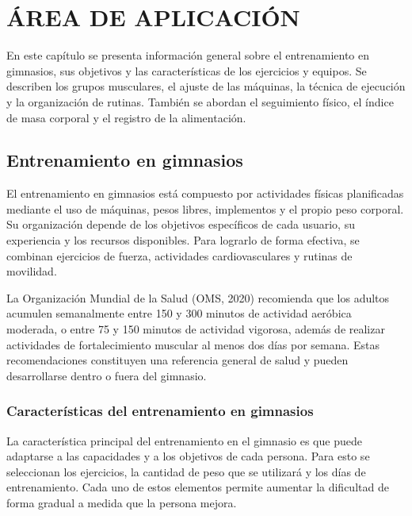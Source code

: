 \chapter{ÁREA DE APLICACIÓN}
\label{cap:area-aplicacion}

En este capítulo se presenta información general sobre el entrenamiento en
gimnasios, sus objetivos y las características de los ejercicios y equipos.
Se describen los grupos musculares, el ajuste de las máquinas, la técnica
de ejecución y la organización de rutinas. También se abordan el seguimiento
físico, el índice de masa corporal y el registro de la alimentación.

\section{Entrenamiento en gimnasios}
\label{sec:entrenamiento-gimnasios}

El entrenamiento en gimnasios está compuesto por actividades físicas
planificadas mediante el uso de máquinas, pesos libres, implementos y el propio
peso corporal. Su organización depende de los objetivos específicos de cada usuario, su
experiencia y los recursos disponibles. Para lograrlo de forma efectiva, se
combinan ejercicios de fuerza, actividades cardiovasculares y rutinas de
movilidad.

La Organización Mundial de la Salud (OMS, 2020) recomienda que los adultos
acumulen semanalmente entre 150 y 300 minutos de actividad aeróbica moderada, o
entre 75 y 150 minutos de actividad vigorosa, además de realizar actividades de
fortalecimiento muscular al menos dos días por semana. Estas recomendaciones
constituyen una referencia general de salud y pueden desarrollarse dentro o
fuera del gimnasio.

\subsection{Características del entrenamiento en gimnasios}

La característica principal del entrenamiento en el gimnasio es que puede
adaptarse a las capacidades y a los objetivos de cada persona. Para esto se
seleccionan los ejercicios, la cantidad de peso que se utilizará y los días de
entrenamiento. Cada uno de estos elementos permite aumentar la dificultad de
forma gradual a medida que la persona mejora.

